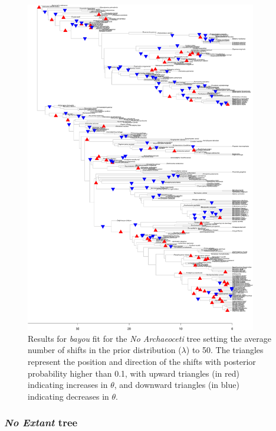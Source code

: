 \begin{figure}[H]
\includegraphics[width=0.9\textwidth]{img/plots-noarchaeo-wZBL-k50-1.pdf}
\caption{Results for \textit{bayou} fit for the \textit{No Archaeoceti} tree setting the average number of shifts in the prior distribution ($\lambda$) to 50. The triangles represent the position and direction of the shifts with posterior probability higher than 0.1, with upward triangles (in red) indicating increases in $\theta$, and downward triangles (in blue) indicating decreases in $\theta$.}
\label{fig:noarchaeo-k50}
\end{figure}

\subsubsection{\textit{No Extant} tree}

